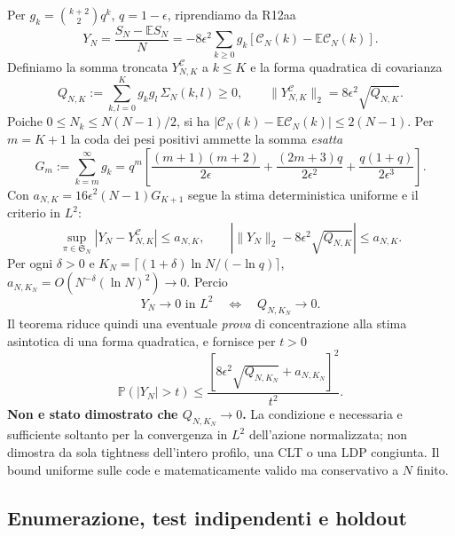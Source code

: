 \documentclass[11pt,a4paper]{article}
\begin{document}
Per $g_k=\binom{k+2}{2}q^k$, $q=1-\epsilon$, riprendiamo da R12aa
\begin{equation}
Y_N=\frac{S_N-\mathbb E S_N}{N}
=-8\epsilon^2\sum_{k\ge0}g_k
[\mathcal C_N(k)-\mathbb E\mathcal C_N(k)].
\label{eq:r12ab_centered}
\end{equation}
Definiamo la somma troncata $Y^{\mathcal C}_{N,K}$ a $k\le K$ e la forma quadratica di covarianza
\begin{equation}
Q_{N,K}:=\sum_{k,l=0}^K g_kg_l\,\Sigma_N(k,l)\ge0,
\qquad \|Y^{\mathcal C}_{N,K}\|_2=8\epsilon^2\sqrt{Q_{N,K}}.
\label{eq:r12ab_qform}
\end{equation}
Poiche $0\le N_k\le N(N-1)/2$, si ha $|\mathcal C_N(k)-\mathbb E\mathcal C_N(k)|\le2(N-1)$. Per $m=K+1$ la coda dei pesi positivi ammette la somma \emph{esatta}
\begin{equation}
G_m:=\sum_{k=m}^{\infty}g_k=q^m\left[
\frac{(m+1)(m+2)}{2\epsilon}
+\frac{(2m+3)q}{2\epsilon^2}
+\frac{q(1+q)}{2\epsilon^3}\right].
\label{eq:r12ab_gtail}
\end{equation}
Con $a_{N,K}=16\epsilon^2(N-1)G_{K+1}$ segue la stima deterministica uniforme e il criterio in $L^2$:
\begin{equation}
\boxed{\sup_{\pi\in\mathfrak S_N}|Y_N-Y^{\mathcal C}_{N,K}|\le a_{N,K},
\qquad\left|\|Y_N\|_2-8\epsilon^2\sqrt{Q_{N,K}}\right|\le a_{N,K}.}
\label{eq:r12ab_l2_equiv}
\end{equation}
Per ogni $\delta>0$ e $K_N=\lceil(1+\delta)\ln N/(-\ln q)\rceil$, $a_{N,K_N}=O(N^{-\delta}(\ln N)^2)\to0$. Percio
\begin{equation}
\boxed{Y_N\to0\text{ in }L^2\quad\Longleftrightarrow\quad Q_{N,K_N}\to0.}
\label{eq:r12ab_concentration_criterion}
\end{equation}
Il teorema riduce quindi una eventuale \emph{prova} di concentrazione alla stima asintotica di una forma quadratica, e fornisce per $t>0$
\begin{equation}
\mathbb P(|Y_N|>t)\le
\frac{\left[8\epsilon^2\sqrt{Q_{N,K_N}}+a_{N,K_N}\right]^2}{t^2}.
\label{eq:r12ab_chebyshev}
\end{equation}
\textbf{Non e stato dimostrato che $Q_{N,K_N}\to0$.} La condizione e necessaria e sufficiente soltanto per la convergenza in $L^2$ dell'azione normalizzata; non dimostra da sola tightness dell'intero profilo, una CLT o una LDP congiunta. Il bound uniforme sulle code e matematicamente valido ma conservativo a $N$ finito.

\subsection{Enumerazione, test indipendenti e holdout}
\end{document}
